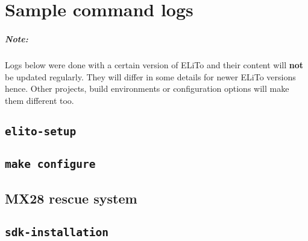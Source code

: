 \chapter{Sample command logs}

\paragraph{Note:}
Logs below were done with a certain version of ELiTo and their content
will \textbf{not} be updated regularly.  They will differ in some
details for newer ELiTo versions hence.  Other projects, build
environments or configuration options will make them different too.

\section[elito-setup]{\texttt{elito-setup}}
\label{app:log:quickstart_elito-setup}


\section[make configure]{\texttt{make configure}}
\label{app:log:quickstart_elito-configure}


\section[MX28 Rescue system]{MX28 rescue system}
\label{app:log:mx28_rescue_system}


\section[sdk-install]{\texttt{sdk-installation}}
\label{app:log:sdk-install}



